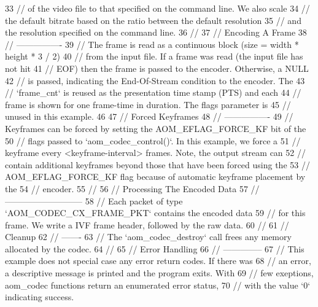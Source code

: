 \begin{DoxyCodeInclude}
33 \textcolor{comment}{// of the video file to that specified on the command line. We also scale}
34 \textcolor{comment}{// the default bitrate based on the ratio between the default resolution}
35 \textcolor{comment}{// and the resolution specified on the command line.}
36 \textcolor{comment}{//}
37 \textcolor{comment}{// Encoding A Frame}
38 \textcolor{comment}{// ----------------}
39 \textcolor{comment}{// The frame is read as a continuous block (size = width * height * 3 / 2)}
40 \textcolor{comment}{// from the input file. If a frame was read (the input file has not hit}
41 \textcolor{comment}{// EOF) then the frame is passed to the encoder. Otherwise, a NULL}
42 \textcolor{comment}{// is passed, indicating the End-Of-Stream condition to the encoder. The}
43 \textcolor{comment}{// `frame\_cnt` is reused as the presentation time stamp (PTS) and each}
44 \textcolor{comment}{// frame is shown for one frame-time in duration. The flags parameter is}
45 \textcolor{comment}{// unused in this example.}
46 
47 \textcolor{comment}{// Forced Keyframes}
48 \textcolor{comment}{// ----------------}
49 \textcolor{comment}{// Keyframes can be forced by setting the AOM\_EFLAG\_FORCE\_KF bit of the}
50 \textcolor{comment}{// flags passed to `aom\_codec\_control()`. In this example, we force a}
51 \textcolor{comment}{// keyframe every <keyframe-interval> frames. Note, the output stream can}
52 \textcolor{comment}{// contain additional keyframes beyond those that have been forced using the}
53 \textcolor{comment}{// AOM\_EFLAG\_FORCE\_KF flag because of automatic keyframe placement by the}
54 \textcolor{comment}{// encoder.}
55 \textcolor{comment}{//}
56 \textcolor{comment}{// Processing The Encoded Data}
57 \textcolor{comment}{// ---------------------------}
58 \textcolor{comment}{// Each packet of type `AOM\_CODEC\_CX\_FRAME\_PKT` contains the encoded data}
59 \textcolor{comment}{// for this frame. We write a IVF frame header, followed by the raw data.}
60 \textcolor{comment}{//}
61 \textcolor{comment}{// Cleanup}
62 \textcolor{comment}{// -------}
63 \textcolor{comment}{// The `aom\_codec\_destroy` call frees any memory allocated by the codec.}
64 \textcolor{comment}{//}
65 \textcolor{comment}{// Error Handling}
66 \textcolor{comment}{// --------------}
67 \textcolor{comment}{// This example does not special case any error return codes. If there was}
68 \textcolor{comment}{// an error, a descriptive message is printed and the program exits. With}
69 \textcolor{comment}{// few exeptions, aom\_codec functions return an enumerated error status,}
70 \textcolor{comment}{// with the value `0` indicating success.}

\end{DoxyCodeInclude}
